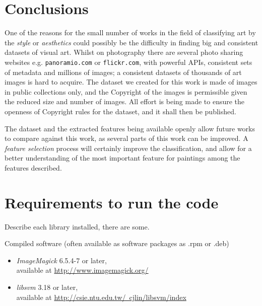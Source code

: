 \documentclass[11pt,a4paper,twoside,openright,draft]{report}
\renewcommand{\bibname}{References}
\begin{document}
\chapter{Conclusions}
\begin{multicols}{2}

One of the reasons for the small number of works in the field of classifying
art by the \emph{style} or \emph{aesthetics} could possibly be the difficulty
in finding big and consistent datasets of visual art.  Whilst on photography
there are several photo sharing websites e.g. \texttt{panoramio.com} or
\texttt{flickr.com}, with powerful APIs, consistent sets of metadata and
millions of images;  a consistent datasets of thousands of art images is hard
to acquire.  The dataset we created for this work is made of images in public
collections only, and the Copyright of the images is permissible given the
reduced size and number of images.  All effort is being made to ensure the
openness of Copyright rules for the dataset, and it shall then be published.

The dataset and the extracted features being available openly allow future
works to compare against this work, as several parts of this work can be
improved.  A \emph{feature selection} process will certainly improve the
classification, and allow for a better understanding of the most important
feature for paintings among the features described.

\end{multicols}

\newpage
{}
\addcontentsline{toc}{chapter}{\bibname}



\appendix

\chapter{Requirements to run the code}
\label{chap:requirements}

Describe each library installed, there are some.

Compiled software (often available as software packages as .rpm or .deb)
\begin{itemize}
\item[]\emph{ImageMagick} 6.5.4-7 or later, \\
available at \href{http://www.imagemagick.org/}{http://www.imagemagick.org/}

\item[]\emph{libsvm} 3.18 or later, \\
available at \href{http://csie.ntu.edu.tw/~cjlin/libsvm/index}
{http://csie.ntu.edu.tw/~cjlin/libsvm/index}
\end{itemize}
\end{document}
